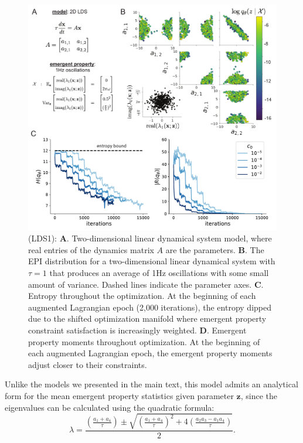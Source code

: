 \documentclass[11pt]{article}
\begin{document}
\begin{figure}
\begin{center}
\includegraphics[scale=0.8]{figures/figLDS1/figLDS1.pdf}
\end{center}
\caption{\small (LDS1): \textbf{A}. Two-dimensional linear dynamical system model, where real entries of the dynamics matrix $A$ are the parameters.  
\textbf{B}. The EPI distribution for a two-dimensional linear dynamical system with $\tau=1$ that produces an average of 1Hz oscillations with some small amount of variance.  Dashed lines indicate the parameter axes. 
\textbf{C}. Entropy throughout the optimization.  
At the beginning of each augmented Lagrangian epoch (2,000 iterations), the entropy dipped due to the shifted optimization manifold where emergent property constraint satisfaction is increasingly weighted.  
\textbf{D}. Emergent property moments throughout optimization.  
At the beginning of each augmented Lagrangian epoch, the emergent property moments adjust closer to their constraints.}
\label{fig:LDS1}
\end{figure}

Unlike the models we presented in the main text, this model admits an analytical form for the mean emergent property statistics given parameter $\mathbf{z}$, since the eigenvalues can be calculated using the quadratic formula: 
\begin{equation}
\lambda = \frac{(\frac{a_1 + a_4}{\tau}) \pm \sqrt{(\frac{a_1+a_4}{\tau})^2 + 4(\frac{a_2 a_3 - a_1 a_4}{\tau})}}{2}.
\end{equation}
\end{document}
